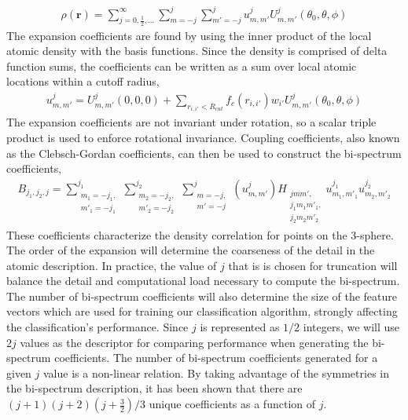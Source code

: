 \documentclass[12pt]{iopart}
\begin{document}
\begin{eqnarray}
\rho(\mathbf{r}) = \sum_{j=0,\frac{1}{2},...}^{\infty} \sum_{m=-j}^j \sum_{m'=-j}^j u^j_{m,m'} U^j_{m,m'} (\theta_0,\theta,\phi)
\end{eqnarray}
The expansion coefficients are found by using the inner product of the local atomic density with the basis functions. Since the density is comprised of delta function sums, the coefficients can be written as a sum over local atomic locations within a cutoff radius,
\begin{eqnarray}
\label{eq:biNN}
u^j_{m,m'}= U^j_{m,m'}(0,0,0) + \sum_{r_{i,i'}<R_{cut}} f_c (r_{i,i'})w_{i'}U^j_{m,m'}(\theta_0,\theta,\phi)
\end{eqnarray}
The expansion coefficients are not invariant under rotation, so a scalar triple product is used to enforce rotational invariance. \cite{Bartok-Partay} Coupling coefficients, also known as the Clebsch-Gordan coefficients, can then be used to construct the bi-spectrum coefficients,
\begin{eqnarray}
B_{j_1,j_2,j} = \sum_{\substack{m_1=-j_1,\\m'_1=-j_1}}^{j_1} \sum_{\substack{m_2=-j_2,\\m'_2=-j_2}}^{j_2} \sum_{\substack{m=-j,\\m'=-j}}^{j} (u_{m,m'}^{j}) H_{\substack{jmm',\\j_{1}m_{1}m'_{1},\\j_{2}m_{2}m'_{2}}} u^{j_{1}}_{m_{1},m'_{1}} u^{j_2}_{m_2,m'_2}
\label{eqn:bispec}
\end{eqnarray}
These coefficients characterize the density correlation for points on the 3-sphere. The order of the expansion will determine the coarseness of the detail in the atomic description. In practice, the value of $j$ that is is chosen for truncation will balance the detail and computational load necessary to compute the bi-spectrum. The number of bi-spectrum coefficients will also determine the size of the feature vectors which are used for training our classification algorithm, strongly affecting the classification's performance. Since $j$ is represented as $1/2$ integers, we will use $2j$ values as the descriptor for comparing performance when generating the bi-spectrum coefficients. The number of bi-spectrum coefficients generated for a given $j$ value is a non-linear relation. By taking advantage of the symmetries in the bi-spectrum description, it has been shown\cite{Thompson2014} that there are $(j+1)(j+2)(j+\frac{3}{2})/3$ unique coefficients as a function of $j$. 
\end{document}
